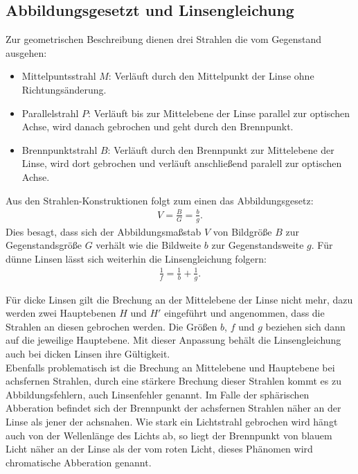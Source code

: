 \subsection{Abbildungsgesetzt und Linsengleichung}
Zur geometrischen Beschreibung dienen drei Strahlen die vom Gegenstand ausgehen:
\begin{itemize}
 \item Mittelpuntsstrahl $M$: Verläuft durch den Mittelpunkt der Linse ohne Richtungsänderung.
 \item Parallelstrahl $P$: Verläuft bis zur Mittelebene der Linse parallel zur optischen Achse,
       wird danach gebrochen und geht durch den Brennpunkt.
 \item Brennpunktstrahl $B$: Verläuft durch den Brennpunkt zur Mittelebene der Linse, wird dort gebrochen und verläuft
       anschließend paralell zur optischen Achse.
\end{itemize}
Aus den Strahlen-Konstruktionen folgt zum einen das Abbildungsgesetz:
\begin{align}
V=\frac{B}{G} = \frac{b}{g}.
\end{align}
Dies besagt, dass sich der Abbildungsmaßstab $V$ von Bildgröße $B$ zur Gegenstandsgröße $G$ verhält wie die
Bildweite $b$ zur Gegenstandsweite $g$.
Für dünne Linsen lässt sich weiterhin die Linsengleichung folgern:
\begin{align}
\frac{1}{f}=\frac{1}{b}+\frac{1}{g}\label{eqn:linse}.
\end{align}

Für dicke Linsen gilt die Brechung an der Mittelebene der Linse nicht mehr, dazu werden zwei Hauptebenen $H$
und $H'$ eingeführt und angenommen, dass die Strahlen an diesen gebrochen werden.
Die Größen $b$, $f$ und $g$ beziehen sich dann auf die jeweilige Hauptebene. Mit dieser Anpassung
behält die Linsengleichung auch bei dicken Linsen ihre Gültigkeit.\\
Ebenfalls problematisch ist die Brechung an Mittelebene und Hauptebene bei achsfernen Strahlen,
durch eine stärkere Brechung dieser Strahlen kommt es zu Abbildungsfehlern, auch Linsenfehler genannt.
Im Falle der sphärischen Abberation befindet sich der Brennpunkt der achsfernen Strahlen
näher an der Linse als jener der achsnahen.
Wie stark ein Lichtstrahl gebrochen wird hängt auch von der Wellenlänge des Lichts ab, so liegt der Brennpunkt
von blauem Licht näher an der Linse als der vom roten Licht, dieses Phänomen wird chromatische Abberation
genannt.

